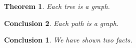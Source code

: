\documentclass{article}
\newtheorem{theorem}{Theorem}
\newtheorem{conclusion}[theorem]{Conclusion}
\newtheorem{summary}{Conclusion}
\begin{document}
\begin{theorem} Each tree is a graph. \end{theorem}
\begin{conclusion} Each path is a graph. \end{conclusion}
\begin{summary} We have shown two facts. \end{summary}
\end{document}
